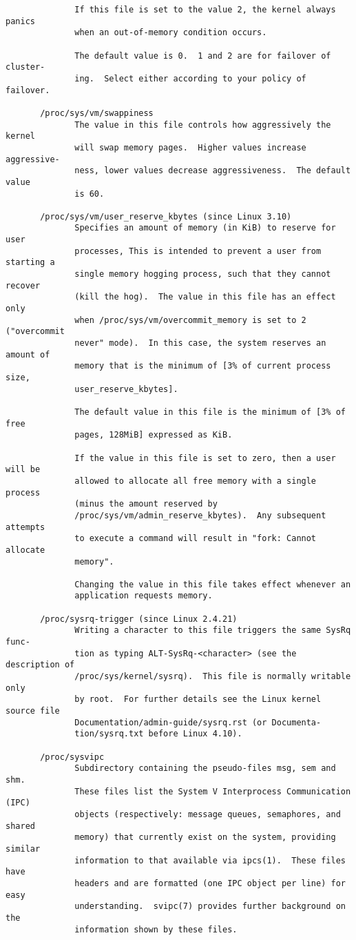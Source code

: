 \documentclass[]{article}
\begin{document}
\begin{verbatim}
              If this file is set to the value 2, the kernel always panics
              when an out-of-memory condition occurs.

              The default value is 0.  1 and 2 are for failover of cluster‐
              ing.  Select either according to your policy of failover.

       /proc/sys/vm/swappiness
              The value in this file controls how aggressively the kernel
              will swap memory pages.  Higher values increase aggressive‐
              ness, lower values decrease aggressiveness.  The default value
              is 60.

       /proc/sys/vm/user_reserve_kbytes (since Linux 3.10)
              Specifies an amount of memory (in KiB) to reserve for user
              processes, This is intended to prevent a user from starting a
              single memory hogging process, such that they cannot recover
              (kill the hog).  The value in this file has an effect only
              when /proc/sys/vm/overcommit_memory is set to 2 ("overcommit
              never" mode).  In this case, the system reserves an amount of
              memory that is the minimum of [3% of current process size,
              user_reserve_kbytes].

              The default value in this file is the minimum of [3% of free
              pages, 128MiB] expressed as KiB.

              If the value in this file is set to zero, then a user will be
              allowed to allocate all free memory with a single process
              (minus the amount reserved by
              /proc/sys/vm/admin_reserve_kbytes).  Any subsequent attempts
              to execute a command will result in "fork: Cannot allocate
              memory".

              Changing the value in this file takes effect whenever an
              application requests memory.

       /proc/sysrq-trigger (since Linux 2.4.21)
              Writing a character to this file triggers the same SysRq func‐
              tion as typing ALT-SysRq-<character> (see the description of
              /proc/sys/kernel/sysrq).  This file is normally writable only
              by root.  For further details see the Linux kernel source file
              Documentation/admin-guide/sysrq.rst (or Documenta‐
              tion/sysrq.txt before Linux 4.10).

       /proc/sysvipc
              Subdirectory containing the pseudo-files msg, sem and shm.
              These files list the System V Interprocess Communication (IPC)
              objects (respectively: message queues, semaphores, and shared
              memory) that currently exist on the system, providing similar
              information to that available via ipcs(1).  These files have
              headers and are formatted (one IPC object per line) for easy
              understanding.  svipc(7) provides further background on the
              information shown by these files.


\end{verbatim}
\end{document}
